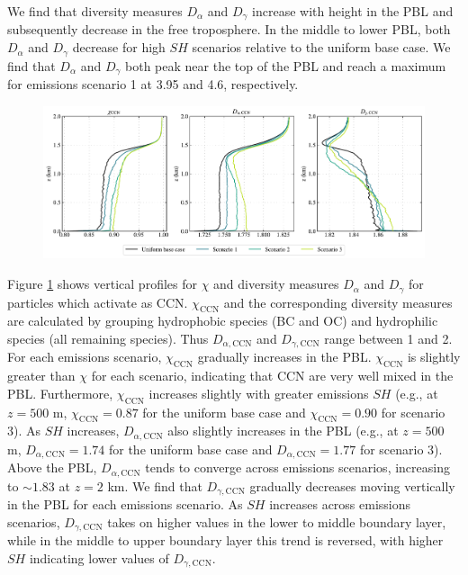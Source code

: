 We find that diversity measures $D_{\alpha}$ and $D_{\gamma}$ increase with height in the PBL and subsequently decrease in the free troposphere. In the middle to lower PBL, both $D_{\alpha}$ and $D_{\gamma}$ decrease for high $SH$ scenarios relative to the uniform base case. We find that $D_{\alpha}$ and $D_{\gamma}$ both peak near the top of the PBL and reach a maximum for emissions scenario 1 at 3.95 and 4.6, respectively. 

\begin{figure}[!t]
  \centering
    \includegraphics[width=\textwidth]{figures/chapter5/aerosol-ccn-mixingstate-vertical-profiles-time36.pdf}
    \caption{}
    \label{fig:ccn-mixing-state-vert-profiles}
\end{figure}

Figure \ref{fig:ccn-mixing-state-vert-profiles} shows vertical profiles for $\chi$ and diversity measures $D_{\alpha}$ and $D_{\gamma}$ for particles which activate as CCN. $\chi_{\text{CCN}}$ and the corresponding diversity measures are calculated by grouping hydrophobic species (BC and OC) and hydrophilic species (all remaining species). Thus $D_{\alpha,\text{CCN}}$ and $D_{\gamma,\text{CCN}}$ range between 1 and 2. For each emissions scenario, $\chi_{\text{CCN}}$ gradually increases in the PBL. $\chi_{\text{CCN}}$ is slightly greater than $\chi$ for each scenario, indicating that CCN are very well mixed in the PBL. Furthermore, $\chi_{\text{CCN}}$ increases slightly with greater emissions $SH$ (e.g., at $z=500$ m, $\chi_{\text{CCN}} = 0.87$ for the uniform base case and $\chi_{\text{CCN}} = 0.90$ for scenario 3). As $SH$ increases, $D_{\alpha,\text{CCN}}$ also slightly increases in the PBL (e.g., at $z=500$ m, $D_{\alpha,\text{CCN}} = 1.74$ for the uniform base case and $D_{\alpha,\text{CCN}} = 1.77$ for scenario 3). Above the PBL, $D_{\alpha,\text{CCN}}$ tends to converge across emissions scenarios, increasing to $\sim1.83$ at $z=2$ km. We find that $D_{\gamma,\text{CCN}}$ gradually decreases moving vertically in the PBL for each emissions scenario. As $SH$ increases across emissions scenarios, $D_{\gamma,\text{CCN}}$ takes on higher values in the lower to middle boundary layer, while in the middle to upper boundary layer this trend is reversed, with higher $SH$ indicating lower values of $D_{\gamma,\text{CCN}}$. 

